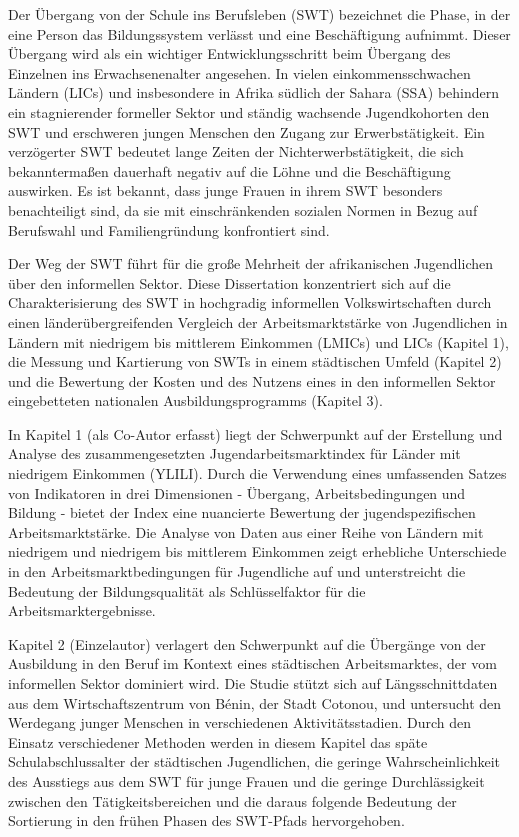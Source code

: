 Der Übergang von der Schule ins Berufsleben (SWT) bezeichnet die Phase, in der eine Person das Bildungssystem verlässt und eine Beschäftigung aufnimmt. Dieser Übergang wird als ein wichtiger Entwicklungsschritt beim Übergang des Einzelnen ins Erwachsenenalter angesehen. In vielen einkommensschwachen Ländern (LICs) und insbesondere in Afrika südlich der Sahara (SSA) behindern ein stagnierender formeller Sektor und ständig wachsende Jugendkohorten den SWT und erschweren jungen Menschen den Zugang zur Erwerbstätigkeit. Ein verzögerter SWT bedeutet lange Zeiten der Nichterwerbstätigkeit, die sich bekanntermaßen dauerhaft negativ auf die Löhne und die Beschäftigung auswirken. Es ist bekannt, dass junge Frauen in ihrem SWT besonders benachteiligt sind, da sie mit einschränkenden sozialen Normen in Bezug auf Berufswahl und Familiengründung konfrontiert sind.

Der Weg der SWT führt für die große Mehrheit der afrikanischen Jugendlichen über den informellen Sektor. Diese Dissertation konzentriert sich auf die Charakterisierung des SWT in hochgradig informellen Volkswirtschaften durch einen länderübergreifenden Vergleich der Arbeitsmarktstärke von Jugendlichen in Ländern mit niedrigem bis mittlerem Einkommen (LMICs) und LICs (Kapitel 1), die Messung und Kartierung von SWTs in einem städtischen Umfeld (Kapitel 2) und die Bewertung der Kosten und des Nutzens eines in den informellen Sektor eingebetteten nationalen Ausbildungsprogramms (Kapitel 3).

In Kapitel 1 (als Co-Autor erfasst) liegt der Schwerpunkt auf der Erstellung und Analyse des zusammengesetzten Jugendarbeitsmarktindex für Länder mit niedrigem Einkommen (YLILI). Durch die Verwendung eines umfassenden Satzes von Indikatoren in drei Dimensionen - Übergang, Arbeitsbedingungen und Bildung - bietet der Index eine nuancierte Bewertung der jugendspezifischen Arbeitsmarktstärke. Die Analyse von Daten aus einer Reihe von Ländern mit niedrigem und niedrigem bis mittlerem Einkommen zeigt erhebliche Unterschiede in den Arbeitsmarktbedingungen für Jugendliche auf und unterstreicht die Bedeutung der Bildungsqualität als Schlüsselfaktor für die Arbeitsmarktergebnisse.

Kapitel 2 (Einzelautor) verlagert den Schwerpunkt auf die Übergänge von der Ausbildung in den Beruf im Kontext eines städtischen Arbeitsmarktes, der vom informellen Sektor dominiert wird. Die Studie stützt sich auf Längsschnittdaten aus dem Wirtschaftszentrum von Bénin, der Stadt Cotonou, und untersucht den Werdegang junger Menschen in verschiedenen Aktivitätsstadien. Durch den Einsatz verschiedener Methoden werden in diesem Kapitel das späte Schulabschlussalter der städtischen Jugendlichen, die geringe Wahrscheinlichkeit des Ausstiegs aus dem SWT für junge Frauen und die geringe Durchlässigkeit zwischen den Tätigkeitsbereichen und die daraus folgende Bedeutung der Sortierung in den frühen Phasen des SWT-Pfads hervorgehoben.

